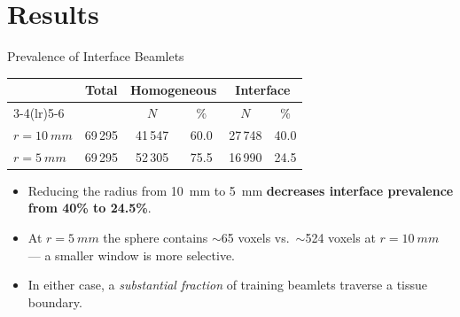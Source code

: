 \documentclass[aspectratio=169, 10pt]{beamer}
\begin{document}
\section{Results}

\begin{frame}{Prevalence of Interface Beamlets}
  \begin{table}
    \centering
    \begin{tabular}{lccccc}
      \toprule
      & \textbf{Total} & \multicolumn{2}{c}{\textbf{Homogeneous}} &
        \multicolumn{2}{c}{\textbf{Interface}} \\
      \cmidrule(lr){3-4}\cmidrule(lr){5-6}
      & & $N$ & \% & $N$ & \% \\
      \midrule
      $r = \SI{10}{mm}$ & 69\,295 & 41\,547 & 60.0 & 27\,748 & 40.0 \\
      $r = \SI{5}{mm}$  & 69\,295 & 52\,305 & 75.5 & 16\,990 & 24.5 \\
      \bottomrule
    \end{tabular}
  \end{table}

  \vspace{6pt}
  \begin{itemize}
    \item Reducing the radius from \SI{10}{mm} to \SI{5}{mm}
          \textbf{decreases interface prevalence from 40\% to 24.5\%}.
    \item At $r = \SI{5}{mm}$ the sphere contains $\sim$65 voxels
          vs.\ $\sim$524 voxels at $r = \SI{10}{mm}$ —
          a smaller window is more selective.
    \item In either case, a \emph{substantial fraction} of training beamlets
          traverse a tissue boundary.
  \end{itemize}
\end{frame}
\end{document}
